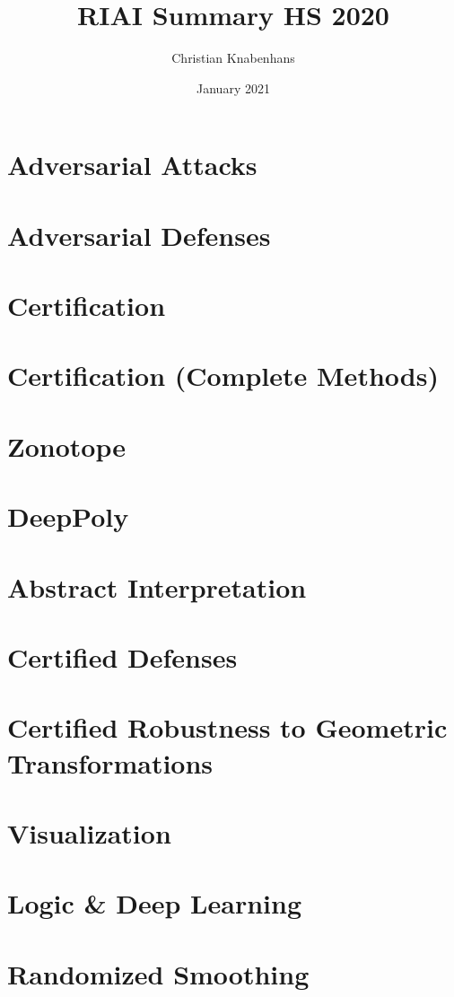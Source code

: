 \documentclass[11pt]{article}
\title{RIAI Summary HS 2020}
\author{Christian Knabenhans}
\date{January 2021}
\begin{document}
\pagestyle{empty}
\begin{multicols*}{3}
\section*{Adversarial Attacks}

\section*{Adversarial Defenses}

\section*{Certification}

\section*{Certification (Complete Methods)}

\section*{Zonotope}

\section*{DeepPoly}

\section*{Abstract Interpretation}

\section*{Certified Defenses }

\section*{Certified Robustness to Geometric Transformations}
\section*{Visualization}
\section*{Logic \& Deep Learning}
\section*{Randomized Smoothing}
\end{multicols*}
\end{document}
